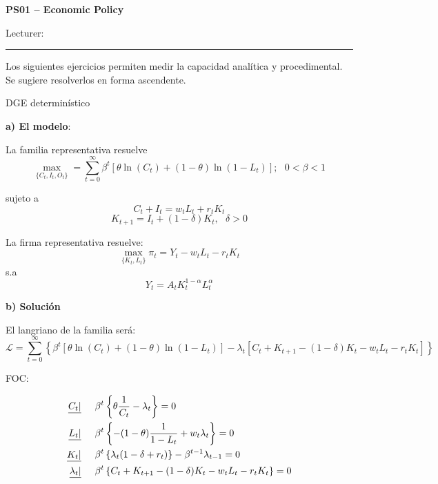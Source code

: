 \documentclass[letterpaper, 11pt]{extarticle}
\begin{document}
\begin{Large}
    \textsf{\textbf{PS01 -- Economic Policy}}
    
    \normalsize \textsf{Lecturer:}  
    \vspace{0.2cm} \hrule
\end{Large}
\vspace{0.2cm}
Los siguientes ejercicios permiten medir la capacidad analítica y procedimental. Se sugiere resolverlos en forma ascendente.




\begin{problem}{DGE determinístico}{}

\textbf{a) El modelo}:

La familia representativa resuelve
\begin{equation}
    \underset{\{C_t,I_t,O_t\}}{\max}=\sum_{t=0}^{\infty} \beta^t[\theta\ln(C_t)+(1-\theta)\ln(1-L_t)]; \ \ \ 0<\beta<1
\end{equation}

sujeto a
\begin{equation}
    C_t+I_t=w_tL_t+r_tK_t
\end{equation}
\begin{equation}
    K_{t+1}=I_t+(1-\delta)K_t, \ \ \ \delta>0
\end{equation}

La firma representativa resuelve:
\begin{equation}
    \underset{\{K_t,L_t\}}{\max} \pi_t=Y_t-w_tL_t-r_tK_t
\end{equation}
s.a
\begin{equation}
    Y_t=A_tK_t^{1-\alpha}L_t^{\alpha}
\end{equation}

\textbf{b) Solución}

El langriano de la familia será:
\begin{equation}
    \mathcal{L}=\sum_{t=0}^{\infty} \left\{\beta^t[\theta\ln(C_t)+(1-\theta)\ln(1-L_t)]-\lambda_t[C_t+K_{t+1}-(1-\delta)K_t-w_tL_t-r_tK_t] \right \}
\end{equation}

FOC:

\begin{align}
    \underline{C_t|} & \hspace{.5cm} \beta^t\left\{\theta \dfrac{1}{C_t}-\lambda_t\right\}=0 \\
    \underline{L_t|}  & \hspace{.5cm} \beta^t\left\{-(1-\theta)\dfrac{1}{1-L_t}+w_t\lambda_t  \right\}=0 \\
    \underline{K_t|} & \hspace{.5cm} \beta^t\left\{\lambda_t(1-\delta+r_t)\right\}-\beta^{t-1}\lambda_{t-1}=0 \\
    \underline{\lambda_t|} & \hspace{.5cm} \beta^t\left\{C_t+K_{t+1}-(1-\delta)K_t-w_tL_t-r_tK_t\right\}=0
\end{align}


\end{problem}
\end{document}
